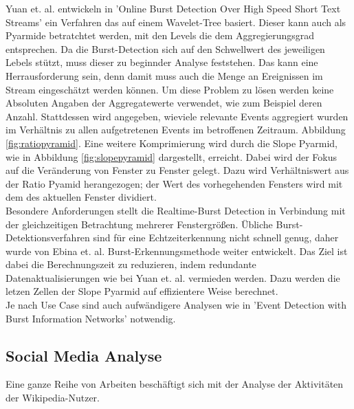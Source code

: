 Yuan et. al. entwickeln in 'Online Burst Detection Over High Speed Short Text Streams' \cite{yuan2007online} ein Verfahren das auf einem Wavelet-Tree basiert. Dieser kann auch als Pyarmide betratchtet werden, mit den Levels die dem Aggregierungsgrad entsprechen. Da die Burst-Detection sich auf den Schwellwert des jeweiligen Lebels stützt, muss dieser zu beginnder Analyse feststehen. Das kann eine Herrausforderung sein, denn damit muss auch die Menge an Ereignissen im Stream eingeschätzt werden können. Um diese Problem zu lösen werden keine Absoluten Angaben der Aggregatewerte verwendet, wie zum Beispiel deren Anzahl. Stattdessen wird angegeben, wieviele relevante Events aggregiert wurden im Verhältnis zu allen aufgetretenen Events im betroffenen Zeitraum. Abbildung \ref{fig:ratiopyramid}. Eine weitere Komprimierung wird durch die Slope Pyarmid, wie in Abbildung \ref{fig:slopepyramid} dargestellt, erreicht. Dabei wird der Fokus auf die Veränderung von Fenster zu Fenster gelegt. Dazu wird Verhältniswert aus der Ratio Pyamid herangezogen; der Wert des vorhegehenden Fensters wird mit dem des aktuellen Fenster dividiert.\cite{yuan2007online}\\

Besondere Anforderungen stellt die Realtime-Burst Detection in Verbindung mit der gleichzeitigen Betrachtung mehrerer Fenstergrößen. Übliche Burst-Detektionsverfahren sind für eine Echtzeiterkennung nicht schnell genug, daher wurde von Ebina et. al. \cite{ebina2011real}  Burst-Erkennungsmethode weiter entwickelt. Das Ziel ist dabei die Berechnungszeit zu reduzieren, indem redundante Datenaktualisierungen wie bei Yuan et. al. vermieden werden. Dazu werden  die letzen Zellen der Slope Pyarmid auf effizientere Weise berechnet.\cite{ebina2011real}\\

Je nach Use Case sind auch aufwändigere Analysen wie in 'Event Detection with Burst Information Networks' \cite{ge2016event} notwendig.


\subsection{Social Media Analyse}
Eine ganze Reihe von Arbeiten beschäftigt sich mit der Analyse der Aktivitäten der Wikipedia-Nutzer.

